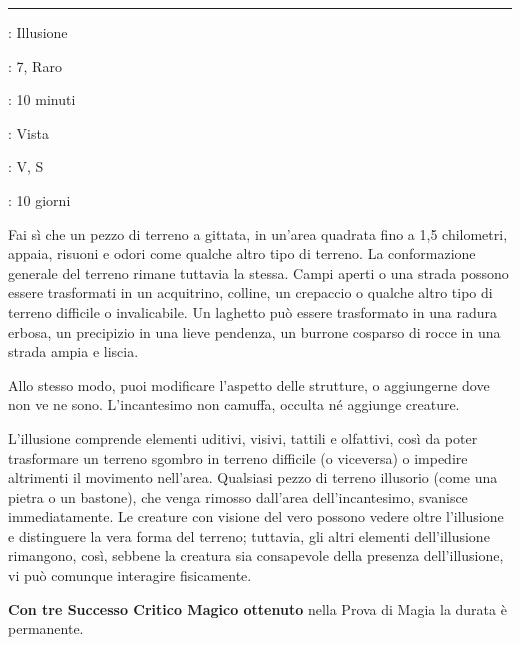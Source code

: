 \begin{multicols}{2}
\begin{itemize}[leftmargin=*]
\end{itemize}

\smallskip\noindent\rule{\linewidth}{2pt} \hypertarget{Miraggio Arcano}{}\medskip{}
\noindent
\begin{description}[noitemsep, topsep=0pt, parsep=0pt, partopsep=0pt, leftmargin=0cm, labelwidth=2.8cm]
	\item[\textbf{Lista di Magia}]: Illusione
	\item[\textbf{Livello}]: 7, Raro
	\item[\textbf{T. di Lancio}]: 10 minuti
	\item[\textbf{Gittata}]: Vista
	\item[\textbf{Componenti}]: V, S
	\item[\textbf{Durata}]: 10 giorni
\end{description}

Fai sì che un pezzo di terreno a gittata, in un'area quadrata fino a 1,5 chilometri, appaia, risuoni e odori come qualche altro tipo di terreno. La conformazione generale del terreno rimane tuttavia la stessa. Campi aperti o una strada possono essere trasformati in un acquitrino, colline, un crepaccio o qualche altro tipo di terreno difficile o invalicabile. Un laghetto può essere trasformato in una radura erbosa, un precipizio in una lieve pendenza, un burrone cosparso di rocce in una strada ampia e liscia.

Allo stesso modo, puoi modificare l'aspetto delle strutture, o aggiungerne dove non ve ne sono. L'incantesimo non camuffa, occulta né aggiunge creature.

L'illusione comprende elementi uditivi, visivi, tattili e olfattivi, così da poter trasformare un terreno sgombro in terreno difficile (o viceversa) o impedire altrimenti il movimento nell'area. Qualsiasi pezzo di terreno illusorio (come una pietra o un bastone), che venga rimosso dall'area dell'incantesimo, svanisce immediatamente. Le creature con visione del vero possono vedere oltre l'illusione e distinguere la vera forma del terreno; tuttavia, gli altri elementi dell'illusione rimangono, così, sebbene la creatura sia consapevole della presenza dell'illusione, vi può comunque interagire fisicamente.

\textbf{Con tre Successo Critico Magico ottenuto} nella Prova di Magia la durata è permanente.


\end{multicols}
